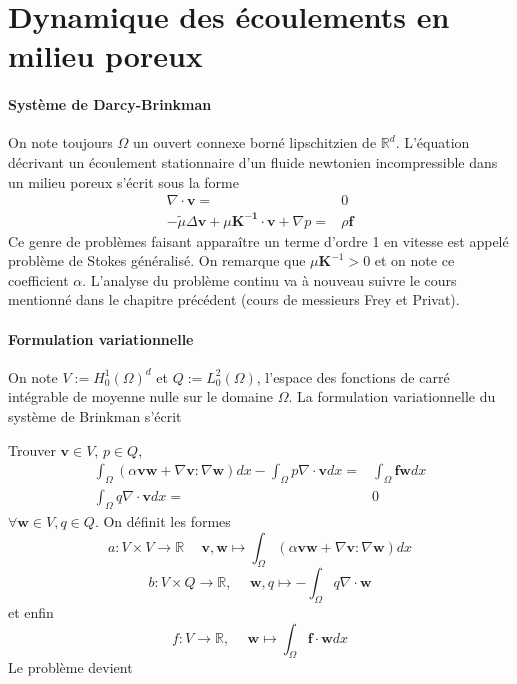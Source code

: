 \section{Dynamique des écoulements en milieu poreux}

\paragraph{Système de Darcy-Brinkman} On note toujours $\Omega$ un ouvert connexe borné lipschitzien de $\mathbb{R}^d$. L'équation décrivant un écoulement stationnaire d'un fluide newtonien incompressible dans un milieu poreux s'écrit sous la forme
\begin{equation*} \tag{B}
\begin{array}{rl}
    \nabla \cdot \mathbf{v} = & 0 \\
    -\tilde{\mu} \Delta \mathbf{v} + \mu \mathbf{K^{-1}} \cdot \mathbf{v} + \nabla p = & \rho \mathbf{f}
\end{array}
\end{equation*}
Ce genre de problèmes faisant apparaître un terme d'ordre 1 en vitesse est appelé problème de Stokes généralisé. On remarque que $\mu \mathbf{K}^{-1} > 0$ et on note ce coefficient $\alpha$. L'analyse du problème continu va à nouveau suivre le cours mentionné dans le chapitre précédent (cours de messieurs Frey et Privat). 

\paragraph{Formulation variationnelle} On note $V := H^1_0(\Omega)^d$ et $Q := L^2_0(\Omega)$, l'espace des fonctions de carré intégrable de moyenne nulle sur le domaine $\Omega$. La formulation variationnelle du système de Brinkman s'écrit

Trouver $\mathbf{v} \in V$, $p \in Q$,
\begin{align*}
    \int_\Omega (\alpha \mathbf{v} \mathbf{w} + \nabla \mathbf{v} : \nabla \mathbf{w}) dx - \int_\Omega p \nabla \cdot \mathbf{v} dx = & \int_\Omega \mathbf{f} \mathbf{w} dx \\
    \int_\Omega q \nabla \cdot \mathbf{v} dx = & 0
\end{align*}
$\forall \mathbf{w} \in V, q \in Q$. On définit les formes $$ a : V \times V \rightarrow \mathbb{R} \hspace{15pt} \mathbf{v}, \mathbf{w} \mapsto \int_\Omega (\alpha \mathbf{v} \mathbf{w} + \nabla \mathbf{v} : \nabla \mathbf{w}) dx $$ $$ b : V \times Q \rightarrow \mathbb{R}, \hspace{15pt} \mathbf{w}, q \mapsto - \int_\Omega q \nabla \cdot \mathbf{w} $$ et enfin $$ f : V \rightarrow \mathbb{R}, \hspace{15pt} \mathbf{w} \mapsto \int_\Omega \mathbf{f} \cdot \mathbf{w} dx $$ Le problème devient

